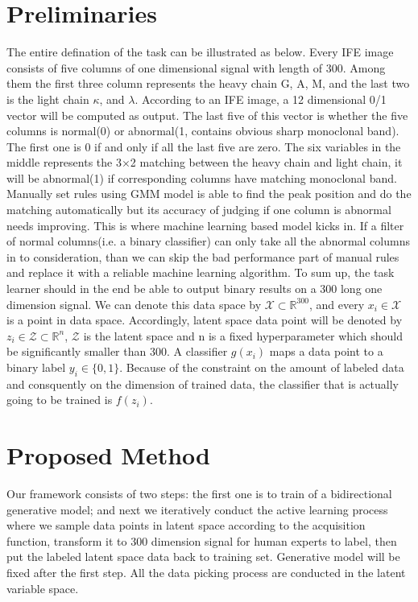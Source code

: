 \documentclass[10pt,twocolumn,letterpaper]{article}
\begin{document}
\section{Preliminaries}
The entire defination of the task can be illustrated as below. Every IFE image consists of five columns of one dimensional signal with length of 300. Among them the first three column represents the heavy chain G, A, M, and the last two is the light chain $\kappa$, and $\lambda$. According to an IFE image, a 12 dimensional 0/1 vector will be computed as output. The last five of this vector is whether the five columns is normal(0) or abnormal(1, contains obvious sharp monoclonal band). The first one is 0 if and only if all the last five are zero. The six variables in the middle represents the 3$\times$2 matching between the heavy chain and light chain, it will be abnormal(1) if corresponding columns have matching monoclonal band. Manually set rules using GMM model is able to find the peak position and do the matching automatically but its accuracy of judging if one column is abnormal needs improving. This is where machine learning based model kicks in. If a filter of normal columns(i.e. a binary classifier) can only take all the abnormal columns in to consideration, than we can skip the bad performance part of manual rules and replace it with a reliable machine learning algorithm. To sum up, the task learner should in the end be able to output binary results on a 300 long one dimension signal. We can denote this data space by $\mathcal{X} \subset \mathbb{R}^{300}$, and every $x_i \in \mathcal{X}$ is a point in data space. Accordingly, latent space data point will be denoted by $z_i \in \mathcal{Z} \subset \mathbb{R}^n$, $\mathcal{Z}$ is the latent space and n is a fixed hyperparameter which should be significantly smaller than 300. A classifier $g(x_i)$ maps a data point to a binary label $y_i \in \{0,1\}$. Because of the constraint on the amount of labeled data and consquently on the dimension of trained data, the classifier that is actually going to be trained is $f(z_i)$.

\section{Proposed Method}

Our framework consists of two steps: the first one is to train of a bidirectional generative model; and next we iteratively conduct the active learning process where we sample data points in latent space according to the acquisition function, transform it to 300 dimension signal for human experts to label, then put the labeled latent space data back to training set. Generative model will be fixed after the first step. All the data picking process are conducted in the latent variable space.
\end{document}

